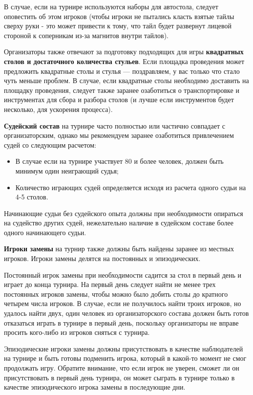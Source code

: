 В случае, если на турнире используются наборы для автостола, следует оповестить об этом игроков (чтобы игроки не пытались класть взятые тайлы сверху руки - это может привести к тому, что тайл будет развернут лицевой стороной к соперникам из-за магнитов внутри тайлов).

Организаторы также отвечают за подготовку подходящих для игры \textbf{квадратных столов и достаточного количества стульев}. Если площадка проведения может предложить квадратные столы и стулья --- поздравляем, у вас только что стало чуть меньше проблем. В случае, если квадратные столы необходимо доставить на площадку проведения, следует также заранее озаботиться о транспортировке и инструментах для сбора и разбора столов (и лучше если инструментов будет несколько, для ускорения процесса).

\textbf{Судейский состав} на турнире часто полностью или частично совпадает с организаторским, однако мы рекомендуем заранее озаботиться привлечением судей со следующим расчетом:
\begin{itemize}
	\item В случае если на турнире участвует 80 и более человек, должен быть минимум один неиграющий судья;
	\item Количество играющих судей определяется исходя из расчета одного судьи на 4-5 столов.
\end{itemize}

Начинающие судьи без судейского опыта должны при необходимости опираться на судейство других судей, нежелательно наличие в судейском составе более одного начинающего судьи.

\textbf{Игроки замены} на турнир также должны быть найдены заранее из местных игроков. Игроки замены делятся на постоянных и эпизодических. 

Постоянный игрок замены при необходимости садится за стол в первый день и играет до конца турнира. На первый день следует найти не менее трех постоянных игроков замены, чтобы можно было добить столы до кратного четырем числа игроков. В случае, если не получилось найти троих игроков, но удалось найти двух, один человек из организаторского состава должен быть готов отказаться играть в турнире в первый день, поскольку организаторы не вправе просить кого-либо из игроков сняться с турнира.

Эпизодические игроки замены должны присутствовать в качестве наблюдателей на турнире и быть готовы подменить игрока, который в какой-то момент не смог продолжать игру. Обратите внимание, что если игрок не уверен, сможет ли он присутствовать в первый день турнира, он может сыграть в турнире только в качестве эпизодического игрока замены в последующие дни. 

